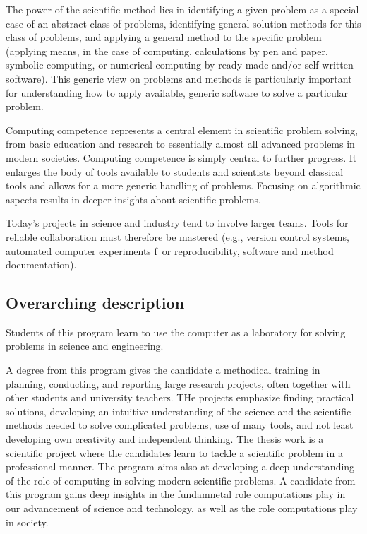 \documentclass{article}
\begin{document}
The power of the scientific method lies in identifying a given problem
as a special case of an abstract class of problems, identifying
general solution methods for this class of problems, and applying a
general method to the specific problem (applying means, in the case of
computing, calculations by pen and paper, symbolic computing, or
numerical computing by ready-made and/or self-written software). This
generic view on problems and methods is particularly important for
understanding how to apply available, generic software to solve a
particular problem.


Computing competence represents a central element
in scientific problem solving, from basic education and research to
essentially almost all advanced problems in modern
societies. Computing competence is simply central to further
progress. It enlarges the body of tools available to students and
scientists beyond classical tools and allows for a more generic
handling of problems. Focusing on algorithmic aspects results in
deeper insights about scientific problems.

Today's projects in science and industry tend to involve larger teams. Tools for reliable collaboration must therefore be mastered (e.g., version control systems, automated computer experiments f\
or reproducibility, software and method documentation).


\subsection{Overarching description}

Students of this program learn to use the computer as a laboratory for
solving problems in science and engineering.


A degree from this program gives the candidate a methodical training
in planning, conducting, and reporting large research projects, often
together with other students and university teachers.  THe projects
emphasize finding practical solutions, developing an intuitive
understanding of the science and the scientific methods needed to
solve complicated problems, use of many tools, and not least
developing own creativity and independent thinking. The thesis work is
a scientific project where the candidates learn to tackle a scientific
problem in a professional manner.  The program aims also at developing
a deep understanding of the role of computing in solving modern
scientific problems. A candidate from this program gains deep insights
in the fundamnetal role computations play in our advancement of
science and technology, as well as the role computations play in
society.
\end{document}
